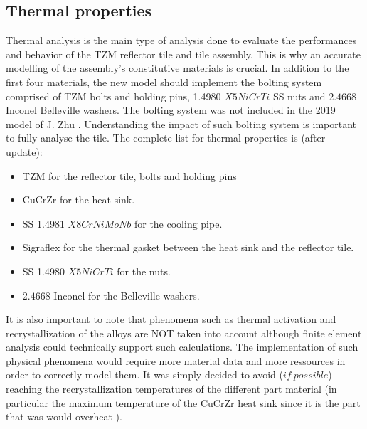 \subsection{Thermal properties}
\normalsize{Thermal analysis is the main type of analysis done to evaluate the performances and behavior of the \acrshort{TZM} reflector tile and tile assembly. This is why an accurate modelling of the assembly's constitutive materials is crucial. In addition to the first four materials, the new model should implement the bolting system comprised of \acrshort{TZM} bolts and holding pins, 1.4980 $X5NiCrTi$ \acrshort{SS} nuts and $2.4668$ Inconel Belleville washers. The bolting system was not included in the 2019 model of J. Zhu \cites{zhu_parametric_2019}. Understanding the impact of such bolting system is important to fully analyse the tile. The complete list for thermal properties is (after update):
\begin{itemize}
    \item \acrlong{TZM} for the reflector tile, bolts and holding pins
    \item \acrlong{CuCrZr} for the heat sink.
    \item \acrlong{SS} 1.4981 $X8CrNiMoNb$ for the cooling pipe.
    \item \acrlong{Sigraflex} for the thermal gasket between the heat sink and the reflector tile.
    \item \acrlong{SS} 1.4980 $X5NiCrTi$ for the nuts.
    \item $2.4668$ Inconel for the Belleville washers.
  \end{itemize}
}
\normalsize{\indent It is also important to note that phenomena such as thermal activation and recrystallization of the alloys are NOT taken into account although finite element analysis could technically support such calculations. The implementation of such physical phenomena would require more material data and more ressources in order to correctly model them. It was simply decided to avoid ($if \ possible$) reaching the recrystallization temperatures of the different part material (in particular the maximum temperature of the \acrshort{CuCrZr} heat sink since it is the part that was would overheat \cites{zhu_parametric_2019}{Fellinger_2013}).}
